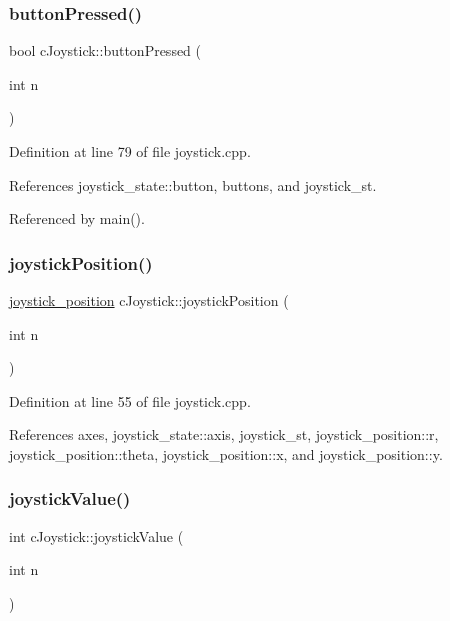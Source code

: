 \subsubsection{\texorpdfstring{button\+Pressed()}{buttonPressed()}}
{\footnotesize\ttfamily bool c\+Joystick\+::button\+Pressed (\begin{DoxyParamCaption}\item[{int}]{n }\end{DoxyParamCaption})}



Definition at line 79 of file joystick.\+cpp.



References joystick\+\_\+state\+::button, buttons, and joystick\+\_\+st.



Referenced by main().

\mbox{\label{classc_joystick_a30d938005453ad77f512094c8a7a99f5}} 
\subsubsection{\texorpdfstring{joystick\+Position()}{joystickPosition()}}
{\footnotesize\ttfamily \hyperlink{structjoystick__position}{joystick\+\_\+position} c\+Joystick\+::joystick\+Position (\begin{DoxyParamCaption}\item[{int}]{n }\end{DoxyParamCaption})}



Definition at line 55 of file joystick.\+cpp.



References axes, joystick\+\_\+state\+::axis, joystick\+\_\+st, joystick\+\_\+position\+::r, joystick\+\_\+position\+::theta, joystick\+\_\+position\+::x, and joystick\+\_\+position\+::y.

\mbox{\label{classc_joystick_a2954017eb51ef6f4658450199e5df5b4}} 
\subsubsection{\texorpdfstring{joystick\+Value()}{joystickValue()}}
{\footnotesize\ttfamily int c\+Joystick\+::joystick\+Value (\begin{DoxyParamCaption}\item[{int}]{n }\end{DoxyParamCaption})}



